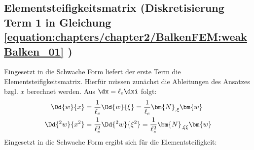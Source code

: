 \documentclass[letterpaper,10pt,german]{jupyterBook}
\begin{document}
\subsection{Elementsteifigkeitsmatrix (Diskretisierung Term 1 in Gleichung \eqref{equation:chapters/chapter2/BalkenFEM:weakBalken_01} )}
\label{\detokenize{chapters/chapter2/BalkenFEM:elementsteifigkeitsmatrix-diskretisierung-term-1-in-gleichung-weakbalken-01}}
\sphinxAtStartPar
Eingesetzt in die Schwache Form liefert der erste Term die Elementsteifigkeitsmatrix. Hierfür müssen zunächst die Ableitungen des Ansatzes bzgl. \(x\) berechnet werden. Aus
\(\dx = \ell_e \dxi\) folgt:
\begin{equation}\label{equation:chapters/chapter2/BalkenFEM:Differentialquotient}
\begin{split}\begin{align}
  \Dd{w}{x} & = \frac{1}{\ell_e} \Dd{w}{\xi} = \frac{1}{\ell_e} \bm{N}_{,\xi} \bm{w} \\
  \Dd{^2 w}{x^2} & = \frac{1}{\ell_e^2} \Dd{^2 w}{\xi^2} = \frac{1}{\ell_e^2} \bm{N}_{,\xi\xi} \bm{w}
\end{align}\end{split}
\end{equation}
\sphinxAtStartPar
Eingesetzt in die Schwache Form ergibt sich für die Elementsteifigkeit:
\end{document}
